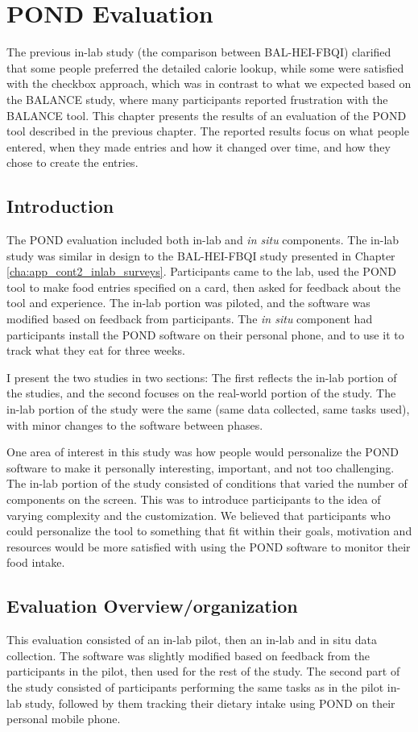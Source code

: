 
\chapter{POND Evaluation}
\label{cha:cont4}
The previous in-lab study (the comparison between BAL-HEI-FBQI) clarified that some people preferred the detailed calorie lookup, while some were satisfied with the checkbox approach, which was in contrast to what we expected based on the BALANCE study, where many participants reported frustration with the BALANCE tool. This chapter presents the results of an evaluation of the POND tool described in the previous chapter. The reported results focus on what people entered, when they made entries and how it changed over time, and how they chose to create the entries.  

\section{Introduction}
The POND evaluation included both in-lab and \textit{in situ} components.  The in-lab study was similar in design to the BAL-HEI-FBQI study presented in Chapter \ref{cha:app_cont2_inlab_surveys}. Participants came to the lab, used the POND tool to make food entries specified on a card, then asked for feedback about the tool and experience. The in-lab portion was piloted, and the software was modified based on feedback from participants. The \textit{in situ} component had participants install the POND software on their  personal phone, and to use it to track what they eat for three weeks. 

I present the two studies in two sections: The first reflects the in-lab portion of the studies, and the second focuses on the real-world portion of the study. The in-lab portion of the study were the same (same data collected, same tasks used), with minor changes to the software between phases. 

One area of interest in this study was how people would personalize the POND software to make it personally interesting, important, and not too challenging. The in-lab portion of the study consisted of conditions that varied the number of components on the screen. This was to introduce participants to the idea of varying complexity and the customization. We believed that participants who could personalize the tool to something that fit within their goals, motivation and resources would be more satisfied with using the POND software to monitor their food intake. 

\section{Evaluation Overview/organization}
This evaluation consisted of an in-lab pilot, then an in-lab and in situ  data collection. The software was slightly modified based on feedback from the participants in the pilot, then used for the rest of the study. The second part of the study consisted of participants performing the same tasks as in the pilot in-lab study, followed by them tracking their dietary intake using POND on their personal mobile phone. 

